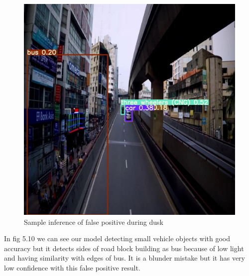 \begin{figure}[ht]
    \centering
    \includegraphics[max width=\textwidth]{images/ours/3 (3).jpg}
   \caption{ Sample inference of false positive during dusk}
    \label{fig:inference346}
\end{figure}

In fig 5.10 we can see our model detecting small vehicle objects with good accuracy but it detects sides of road block building as bus because of low light and having similarity with edges of bus. It is a blunder mistake but it has very low confidence with this false positive result.
\newpage


